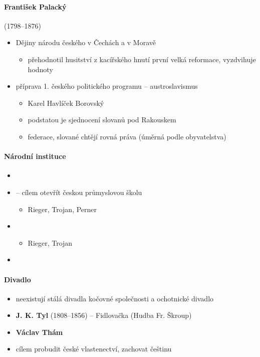 \paragraph{František Palacký} (1798--1876)
\begin{itemize}
\item Dějiny národu českého v Čechách a v Moravě
	\begin{itemize}
	\item přehodnotil husitství z kacířského hnutí \ra první velká reformace, vyzdvihuje hodnoty
	\end{itemize}
\item příprava 1. českého politického programu -- austroslavismus
	\begin{itemize}
	\item Karel Havlíček Borovský
	\item podstatou je sjednocení slovanů pod Rakouskem 
	\item[\ra] federace, slované chtějí rovná práva (úměrná podle obyvatelstva)
	\end{itemize}
\end{itemize}

\paragraph{Národní instituce}
\begin{itemize}
\item {}

\item {} -- cílem otevřít českou průmyslovou školu 
	\begin{itemize}
	\item Rieger, Trojan, Perner
	\end{itemize}
\item {}
	\begin{itemize}
	\item Rieger, Trojan
	\end{itemize}
\item {}
\end{itemize}

\paragraph{Divadlo}
\begin{itemize}
\item neexistují stálá divadla \ra kočovné společnosti a ochotnické divadlo
\item \textbf{J. K. Tyl} (1808--1856) -- Fidlovačka (Hudba Fr. Škroup)
\item \textbf{Václav Thám}
\item cílem probudit české vlastenectví, zachovat češtinu
\end{itemize}

